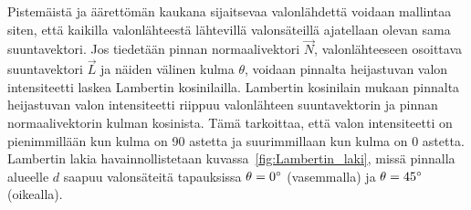 \documentclass[finnish]{tktltiki2}
\theoremstyle{definition}
\theoremstyle{remark}
\begin{document}
Pistemäistä ja äärettömän kaukana sijaitsevaa valonlähdettä voidaan mallintaa siten, että kaikilla valonlähteestä lähtevillä valonsäteillä ajatellaan olevan sama suuntavektori. Jos tiedetään pinnan normaalivektori $\vec{N}$, valonlähteeseen osoittava suuntavektori $\vec{L}$ ja näiden välinen kulma $\theta$, voidaan pinnalta heijastuvan valon intensiteetti laskea Lambertin kosinilailla.
Lambertin kosinilain mukaan pinnalta heijastuvan valon intensiteetti riippuu valonlähteen suuntavektorin ja pinnan normaalivektorin kulman kosinista. Tämä tarkoittaa, että valon intensiteetti on pienimmillään kun kulma on 90 astetta ja suurimmillaan kun kulma on 0 astetta. Lambertin lakia havainnollistetaan kuvassa~\ref{fig:Lambertin_laki}, missä pinnalla alueelle $d$ saapuu valonsäteitä tapauksissa $\theta = 0\degree$ (vasemmalla) ja $\theta = 45\degree$ (oikealla). 
\begin{figure}[h]
\centering
{}
\end{figure}
\end{document}
